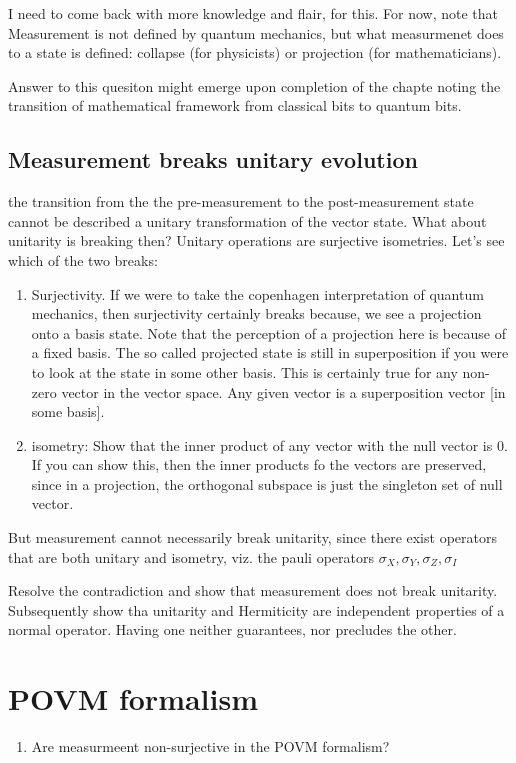 \documentclass[a4paper,12pt]{amsbook}
\newcommand{\0}{{$|0\rangle$}}
\newcommand{\1}{{$|1\rangle$}}
\begin{document}
\begin{enumerate}
I need to come back with more knowledge and flair, for this. For now, note that Measurement is not defined by quantum mechanics, but what measurmenet does to a state is defined: collapse (for physicists) or projection (for mathematicians).

Answer to this quesiton might emerge upon completion of  the chapte noting the transition of mathematical framework from classical bits to quantum bits.
    \section{Measurement breaks unitary evolution}
    the transition from the the pre-measurement to the post-measurement state cannot be described a unitary transformation of the vector state. What about unitarity is breaking then? Unitary operations are surjective isometries. Let's see which of the two breaks:
    \begin{enumerate}
        \item Surjectivity. If we were to take the copenhagen interpretation of quantum mechanics, then surjectivity certainly breaks because, we see a projection onto a basis state. Note that the perception of a projection here is because of a fixed basis. The so called projected state is still in superposition if you were to look at the state in some other basis. This is certainly true for any non-zero vector in the vector space. Any given vector is a superposition vector [in some basis].
        \item isometry: Show that the inner product of any vector with the null vector is 0. If you can show this, then the inner products fo the vectors are preserved, since in a projection, the orthogonal subspace is just the singleton set of null vector.
    \end{enumerate}
    But measurement cannot necessarily break unitarity, since there exist operators that are both unitary and isometry, viz. the pauli operators $\sigma_X, \sigma_Y, \sigma_Z, \sigma_I$

    Resolve the contradiction and show that measurement does not break unitarity. Subsequently show tha unitarity and Hermiticity are independent properties of a normal operator. Having one neither guarantees, nor precludes the other. 

    \chapter{POVM formalism}
    \begin{enumerate}
        \item Are measurmeent non-surjective in the POVM formalism?
    \end{enumerate}
    

\end{enumerate}
\end{document}
